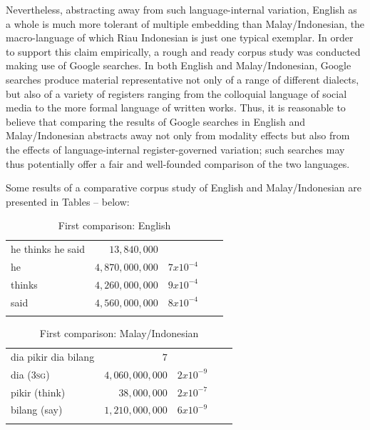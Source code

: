 \documentclass[output=paper,colorlinks,citecolor=brown
]{langscibook}
\begin{document}
Nevertheless, abstracting away from such language-internal variation, English as a whole is much more tolerant of multiple embedding than Malay/Indonesian, the macro-language of which Riau Indonesian is just one typical exemplar.  In order to support this claim empirically, a rough and ready corpus study was conducted making use of Google searches.  In both English and Malay/Indonesian, Google searches produce material representative not only of a range of different dialects, but also of a variety of registers ranging from the colloquial language of social media to the more formal language of written works.  Thus, it is reasonable to believe that comparing the results of Google searches in English and Malay/Indonesian abstracts away not only from modality effects but also from the effects of language-internal register-governed variation; such searches may thus potentially offer a fair and well-founded comparison of the two languages.

Some results of a comparative corpus study of English and Malay/Indonesian are presented in Tables -- below:

\begin{table}
\caption{First comparison: English}
\label{tab:first-english}
 \begin{tabularx}{.8\textwidth}{X rrrr}
 \lsptoprule
 he thinks he said & $13,840,000$ & {} \\
 he & $4,870,000,000$ & $7 x 10^{-4}$ \\
 thinks & $4,260,000,000$ & $9 x 10^{-4}$\\
 said & $4,560,000,000$ & $8 x 10^{-4}$\\
 \lspbottomrule
 \end{tabularx}
\end{table}

\begin{table}
\caption{First comparison: Malay/Indonesian}
\label{tab:first-malay}
 \begin{tabularx}{.8\textwidth}{X rrrr}
 \lsptoprule
 dia pikir dia bilang & $7$ & {} \\
 dia (3\textsc{sg}) & $4,060,000,000$ & $2 x 10^{-9}$ \\
 pikir (think) & $38,000,000$ & $2 x 10^{-7}$\\
 bilang (say) & $1,210,000,000$ & $6 x 10^{-9}$\\
 \lspbottomrule
 \end{tabularx}
\end{table}
\end{document}
